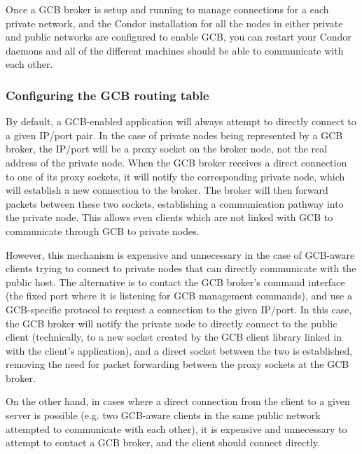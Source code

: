 Once a GCB broker is setup and running to manage connections for a
each private network, and the Condor installation for all the nodes in
either private and public networks are configured to enable GCB, you
can restart your Condor daemons and all of the different machines
should be able to communicate with each other.


\subsubsection{\label{sec:GCB-routing-table}Configuring the GCB
  routing table} 

By default, a GCB-enabled application will always attempt to directly
connect to a given IP/port pair.
In the case of private nodes being represented by a GCB broker, the
IP/port will be a proxy socket on the broker node, not the real
address of the private node.
When the GCB broker receives a direct connection to one of its proxy 
sockets, it will notify the corresponding private node, which will
establish a new connection to the broker.
The broker will then forward packets between these two sockets,
establishing a communication pathway into the private node.
This allows even clients which are not linked with GCB to communicate
through GCB to private nodes.

However, this mechanism is expensive and unnecessary in the case of
GCB-aware clients trying to connect to private nodes that can directly
communicate with the public host.
The alternative is to contact the GCB broker's command interface (the
fixed port where it is listening for GCB management commands), and use
a GCB-specific protocol to request a connection to the given IP/port.
In this case, the GCB broker will notify the private node to directly
connect to the public client (technically, to a new socket created by
the GCB client library linked in with the client's application), and a
direct socket between the two is established, removing the need for
packet forwarding between the proxy sockets at the GCB broker.

On the other hand, in cases where a direct connection from the client
to a given server is possible (e.g. two GCB-aware clients in the same
public network attempted to communicate with each other), it is
expensive and unnecessary to attempt to contact a GCB broker, and the
client should connect directly.

